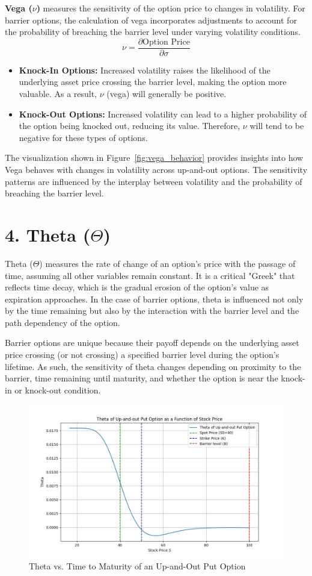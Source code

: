\textbf{Vega (\(\nu\))} measures the sensitivity of the option price to changes in volatility. For barrier options, the calculation of vega incorporates adjustments to account for the probability of breaching the barrier level under varying volatility conditions.
\[
\nu = \frac{\partial \text{Option Price}}{\partial \sigma}
\]

\begin{itemize}
    \item \textbf{Knock-In Options:} Increased volatility raises the likelihood of the underlying asset price crossing the barrier level, making the option more valuable. As a result, \(\nu\) (vega) will generally be positive.
    \item \textbf{Knock-Out Options:} Increased volatility can lead to a higher probability of the option being knocked out, reducing its value. Therefore, \(\nu\) will tend to be negative for these types of options.
\end{itemize}

The visualization shown in Figure~\ref{fig:vega_behavior} provides insights into how Vega behaves with changes in volatility across up-and-out options. The sensitivity patterns are influenced by the interplay between volatility and the probability of breaching the barrier level.


\section*{4. Theta (\(\Theta\))}

Theta (\(\Theta\)) measures the rate of change of an option's price with the passage of time, assuming all other variables remain constant. It is a critical "Greek" that reflects time decay, which is the gradual erosion of the option's value as expiration approaches. In the case of barrier options, theta is influenced not only by the time remaining but also by the interaction with the barrier level and the path dependency of the option.

Barrier options are unique because their payoff depends on the underlying asset price crossing (or not crossing) a specified barrier level during the option's lifetime. As such, the sensitivity of theta changes depending on proximity to the barrier, time remaining until maturity, and whether the option is near the knock-in or knock-out condition.

\begin{figure}[h]
    \centering
    \includegraphics[width=.65\linewidth]{content/images/theta_upout.png}
    \caption{Theta vs. Time to Maturity of an Up-and-Out Put Option}
    \label{fig:theta_behavior}
\end{figure}

